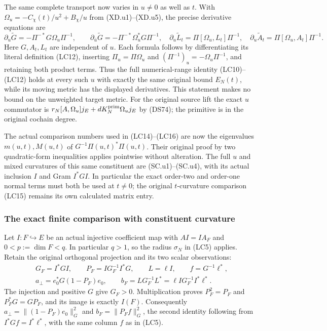 The same complete transport now varies in $u\ne0$ as well as $t$.
With $\Omega_u=-C_\chi(t)/u^2+B_\chi/u$ from (XD.u1)--(XD.u5),
the precise derivative equations are
\[
 \partial_u\widetilde G=-\Pi^{-*}G\Omega_u\Pi^{-1},\qquad
 \partial_{\bar u}\widetilde G=-\Pi^{-*}\Omega_u^*G\Pi^{-1},
 \quad
 \partial_u\widetilde L_t=\Pi[\Omega_u,L_t]\Pi^{-1},
 \quad
 \partial_u\widetilde A_t=\Pi[\Omega_u,A_t]\Pi^{-1}.
 \tag{LC.u1}
\]
Here $G,A_t,L_t$ are independent of $u$.  Each formula follows
by differentiating its literal definition (LC12), inserting
$\Pi_u=\Pi\Omega_u$ and
$(\Pi^{-1})_u=-\Omega_u\Pi^{-1}$, and retaining both product
terms.  Thus the full numerical-range identity (LC10)--(LC12)
holds at every such $u$ with exactly the same original bound
$E_N(t)$, while its moving metric has the displayed derivatives.
This statement makes no bound on the unweighted target metric.
For the original source lift the exact $u$ commutator is
$r_N[A,\Omega_u]j_E+dK_N^{\rm prim}\Omega_u j_E$
by (DS74); the primitive is in the original cochain degree.

The actual comparison numbers used in (LC14)--(LC16) are now
the eigenvalues $m(u,t),M(u,t)$ of
$G^{-1}\Pi(u,t)^*\Pi(u,t)$.  Their original proof by two
quadratic-form inequalities applies pointwise without alteration.
The full $u$ and mixed curvatures of this same constituent are
(SC.u1)--(SC.u4), with its actual inclusion $I$ and Gram $I^*GI$.
In particular the exact order-two and order-one normal terms
must both be used at $t\ne0$; the original $t$-curvature
comparison (LC15) remains its own calculated matrix entry.

\subsubsection{The exact finite comparison with constituent curvature}

Let $I:F\hookrightarrow E$ be an actual injective coefficient map
with $AI=IA_F$ and $0<p:=\dim F<q$. In particular $q>1$, so
the radius $\sigma_N$ in (LC5) applies. Retain the original
orthogonal projection and its two scalar observations:
\[
\begin{gathered}
 G_F=I^*GI,\qquad P_F=I G_F^{-1}I^*G,\qquad L=\ell I,\qquad
 f=G^{-1}\ell^*,\\
 a_\perp=e_0^*G(1-P_F)e_0,\qquad
 b_F=L G_F^{-1}L^*=\ell I G_F^{-1}I^*\ell^*.
\end{gathered}\tag{LC13}
\]
The injection and positive $G$ give $G_F>0$. Multiplication proves
$P_F^2=P_F$ and $P_F^*G=GP_F$, and its image is exactly $I(F)$.
Consequently $a_\perp=\|(1-P_F)e_0\|_G^2$ and
$b_F=\|P_Ff\|_G^2$, the second identity following from
$I^*Gf=I^*\ell^*$, with the same column $f$ as in (LC5).

